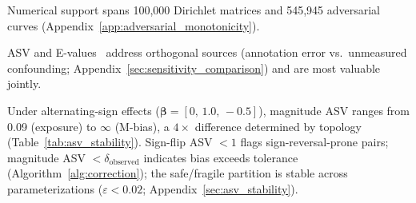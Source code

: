 Numerical support spans 100{,}000 Dirichlet matrices and 545{,}945 adversarial curves (Appendix~\ref{app:adversarial_monotonicity}).

\begin{remark}
\label{rem:evalue}
ASV and E-values~\cite{vanderweele_ding2017} address orthogonal sources (annotation error vs.\ unmeasured confounding; Appendix~\ref{sec:sensitivity_comparison}) and are most valuable jointly.
\end{remark}

Under alternating-sign effects ($\boldsymbol{\beta}{=}[0,\,1.0,\,-0.5]$), magnitude ASV ranges from 0.09 (exposure) to $\infty$ (M-bias), a $4{\times}$ difference determined by topology (Table~\ref{tab:asv_stability}). Sign-flip ASV $< 1$ flags sign-reversal-prone pairs; magnitude ASV $< \delta_{\text{observed}}$ indicates bias exceeds tolerance (Algorithm~\ref{alg:correction}); the safe/fragile partition is stable across parameterizations ($\varepsilon < 0.02$; Appendix~\ref{sec:asv_stability}).
